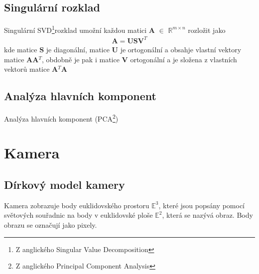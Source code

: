 \documentclass[twoside]{ctuthesis}
\newcommand{\spc}[2]{$\mathbb{#1}^{#2}$}
\newcommand{\tl}[1]{$\mathbf{#1}$}
\begin{document}
\section{Singulární rozklad}
Singulární SVD\footnote{Z anglického Singular Value Decomposition}rozklad umožní každou matici \tl{A} $\in$ \spc{R}{m \times n} rozložit jako
\begin{align}
    \mathbf{A} = \mathbf{USV}^T
\end{align}
kde matice \tl{S} je diagonální, matice \tl{U} je ortogonální a obsahje vlastní vektory matice \tl{AA}$^T$, obdobně je pak i matice \tl{V} ortogonální a je složena z vlastních vektorů matice \tl{A}$^T$\tl{A}

\section{Analýza hlavních komponent}
Analýza hlavních komponent (PCA\footnote{Z anglického Principal Component Analysis}) 

\chapter{Kamera}

\section{Dírkový model kamery}
Kamera zobrazuje body euklidovského prostoru $\mathbb{E}^3$, které jsou popsány pomocí světových souřadnic na body v euklidovské ploše $\mathbb{E}^2$, která se nazývá obraz. Body obrazu se označují jako pixely. 
\end{document}
